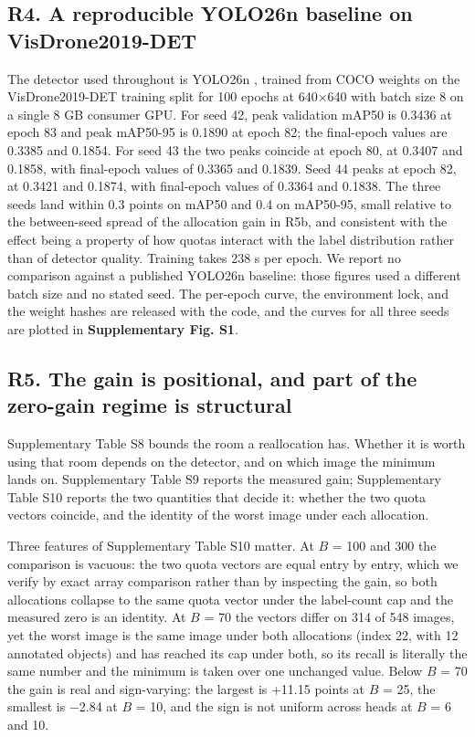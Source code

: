 \documentclass[sn-mathphys,Numbered]{sn-jnl}
\begin{document}
\subsection{R4. A reproducible YOLO26n baseline on VisDrone2019-DET}

The detector used throughout is YOLO26n \cite{jocher2026yolo26}, trained from COCO weights \cite{lin2014coco} on the VisDrone2019-DET training split \cite{zhu2021visdrone} for 100 epochs at 640$\times$640 with batch size 8 on a single 8 GB consumer GPU. For seed 42, peak validation mAP50 is 0.3436 at epoch 83 and peak mAP50-95 is 0.1890 at epoch 82; the final-epoch values are 0.3385 and 0.1854. For seed 43 the two peaks coincide at epoch 80, at 0.3407 and 0.1858, with final-epoch values of 0.3365 and 0.1839. Seed 44 peaks at epoch 82, at 0.3421 and 0.1874, with final-epoch values of 0.3364 and 0.1838. The three seeds land within 0.3 points on mAP50 and 0.4 on mAP50-95, small relative to the between-seed spread of the allocation gain in R5b, and consistent with the effect being a property of how quotas interact with the label distribution rather than of detector quality. Training takes 238 s per epoch. We report no comparison against a published YOLO26n baseline: those figures used a different batch size and no stated seed. The per-epoch curve, the environment lock, and the weight hashes are released with the code, and the curves for all three seeds are plotted in \textbf{Supplementary Fig. S1}.

\subsection{R5. The gain is positional, and part of the zero-gain regime is structural}

Supplementary Table S8 bounds the room a reallocation has. Whether it is worth using that room depends on the detector, and on which image the minimum lands on. Supplementary Table S9 reports the measured gain; Supplementary Table S10 reports the two quantities that decide it: whether the two quota vectors coincide, and the identity of the worst image under each allocation.

Three features of Supplementary Table S10 matter. At $B$ = 100 and 300 the comparison is vacuous: the two quota vectors are equal entry by entry, which we verify by exact array comparison rather than by inspecting the gain, so both allocations collapse to the same quota vector under the label-count cap and the measured zero is an identity. At $B$ = 70 the vectors differ on 314 of 548 images, yet the worst image is the same image under both allocations (index 22, with 12 annotated objects) and has reached its cap under both, so its recall is literally the same number and the minimum is taken over one unchanged value. Below $B$ = 70 the gain is real and sign-varying: the largest is +11.15 points at $B$ = 25, the smallest is $-$2.84 at $B$ = 10, and the sign is not uniform across heads at $B$ = 6 and 10.
\end{document}
